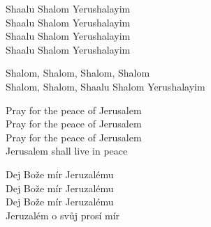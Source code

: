 
\ve{}
Shaalu Shalom Yerushalayim\\
Shaalu Shalom Yerushalayim\\
Shaalu Shalom Yerushalayim\\
Shaalu Shalom Yerushalayim

\cho{}
Shalom, Shalom, Shalom, Shalom\\
Shalom, Shalom, Shaalu Shalom Yerushalayim

\ve{}
Pray for the peace of Jerusalem\\
Pray for the peace of Jerusalem\\
Pray for the peace of Jerusalem\\
Jerusalem shall live in peace

\cho{}

\ve{}
Dej Bože mír Jeruzalému\\
Dej Bože mír Jeruzalému\\
Dej Bože mír Jeruzalému\\
Jeruzalém o svůj prosí mír

\cho{}

\esong